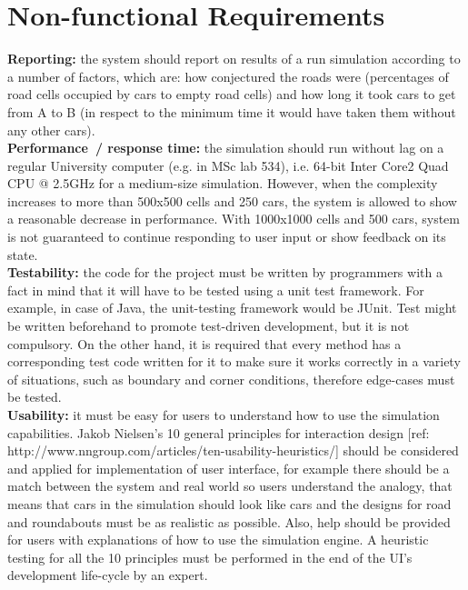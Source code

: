 \documentclass[]{article}
\begin{document}
\section*{Non-functional Requirements}
\textbf{Reporting:} the system should report on results of a run simulation according to a number of factors, which are: how conjectured the roads were (percentages of road cells occupied by cars to empty road cells) and how long it took cars to get from A to B (in respect to the minimum time it would have taken them without any other cars).\\

\noindent
\textbf{Performance / response time:} the simulation should run without lag on a regular University computer (e.g. in MSc lab 534), i.e. 64-bit Inter Core2 Quad CPU @ 2.5GHz for a medium-size simulation. However, when the complexity increases to more than 500x500 cells and 250 cars, the system is allowed to show a reasonable decrease in performance. With 1000x1000 cells and 500 cars, system is not guaranteed to continue responding to user input or show feedback on its state.\\

\noindent
\textbf{Testability:} the code for the project must be written by programmers with a fact in mind that it will have to be tested using a unit test framework. For example, in case of Java, the unit-testing framework would be JUnit. Test might be written beforehand to promote test-driven development, but it is not compulsory. On the other hand, it is required that every method has a corresponding test code written for it to make sure it works correctly in a variety of situations, such as boundary and corner conditions, therefore edge-cases must be tested.\\

\noindent 
\textbf{Usability:} it must be easy for users to understand how to use the simulation capabilities. Jakob Nielsen's 10 general principles for interaction design [ref: http://www.nngroup.com/articles/ten-usability-heuristics/] should be considered and applied for implementation of user interface, for example there should be a match between the system and real world so users understand the analogy, that means that cars in the simulation should look like cars and the designs for road and roundabouts must be as realistic as possible. Also, help should be provided for users with explanations of how to use the simulation engine. A heuristic testing for all the 10 principles must be performed in the end of the UI’s development life-cycle by an expert. \\
\end{document}

